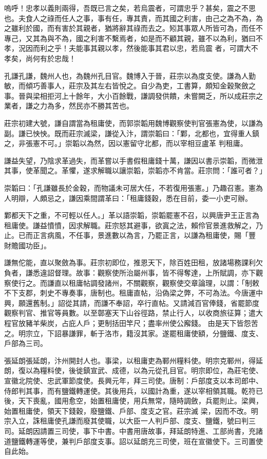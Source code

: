 \begin{pinyinscope}
 嗚呼！忠孝以義則兩得，吾既已言之矣，若烏震者，可謂忠乎？甚矣，震之不思也。夫食人之祿而任人之事，事有任，專其責，而其國之利害，由己之為不為，為之雖利於國，而有害於其親者，猶將辭其祿而去之。矧其事眾人所皆可為，而任不專己，又其為與不為，國之利害不繫焉者，如是而不顧其親，雖不以為利，猶曰不孝，況因而利之乎！夫能事其親以孝，然後能事其君以忠，若烏震
 者，可謂大不孝矣，尚何有於忠哉！



 孔謙孔謙，魏州人也，為魏州孔目官。魏博入于晉，莊宗以為度支使。謙為人勤敏，而傾巧善事人，莊宗及其左右皆悅之。自少為吏，工書算，頗知金穀聚斂之事。晉與梁相拒河上十餘年，大小百餘戰，謙調發供饋，未嘗闕乏，所以成莊宗之業者，謙之力為多，然民亦不勝其苦也。



 莊宗初建大號，謙自謂當為租庸使，而郭崇韜用魏博觀察使判官張憲為使，以謙為副。謙已怏怏。既而莊宗滅梁，謙從入汴，謂崇韜曰：「鄴，北都也，宜得重人鎮之，非張憲不可。」崇韜以為然，因以憲留守北都，而以宰相豆盧革
 判租庸。



 謙益失望，乃陰求革過失，而革嘗以手書假租庸錢十萬，謙因以書示崇韜，而微泄其事，使革聞之。革懼，遂求解職以讓崇韜，崇韜亦不肯當。莊宗問：「誰可者？」



 崇韜曰：「孔謙雖長於金穀，而物議未可居大任，不若復用張憲。」乃趣召憲。憲為人明辯，人頗忌之，謙因乘間謂革曰：「租庸錢穀，悉在目前，委一小吏可辦。



 鄴都天下之重，不可輕以任人。」革以語崇韜，崇韜罷憲不召，以興唐尹王正言為租庸使。謙益憤憤，因求解職。莊宗怒其避事，欲寘之法，賴伶官景進救解之，乃止。已而正言病風，不任事，景進數以為言，乃罷正言，以謙為租庸使，賜「豐
 財贍國功臣」。



 謙無佗能，直以聚斂為事。莊宗初即位，推恩天下，除百姓田租，放諸場務課利欠負者，謙悉違詔督理。故事：觀察使所治屬州事，皆不得奪達，上所賦調，亦下觀察使行之。而謙直以租庸帖調發諸州，不關觀察，觀察使交章論理，以謂：「制敕不下支郡，刺史不專奏事，唐制也。租庸直帖，沿偽梁之弊，不可為法。今唐運中興，願還舊制。」詔從其請，而謙不奉詔，卒行直帖。又請減百官俸錢，省罷節度觀察判官、推官等員數。以至鄣塞天下山谷徑路，禁止行人，以收商旅征算；遣大程官放豬羊柴炭，占庇人戶；更制括田竿尺；盡率州使公廨錢。
 由是天下皆怨苦之。明宗立，下詔暴謙罪，斬于洛市，籍沒其家。遂罷租庸使額，分鹽鐵、度支、戶部為三司。



 張延朗張延朗，汴州開封人也。事梁，以租庸吏為鄆州糧料使。明宗克鄆州，得延朗，復以為糧料使，後徙鎮宣武、成德，以為元從孔目官。明宗即位，為莊宅使、宣徽北院使、忠武軍節度使。長興元年，拜三司使。唐制：戶部度支以本司郎中、侍郎判其事，而有鹽鐵轉運使。其後用兵，以國計為重，遂以宰相領其職。乾符已後，天下喪亂，國用愈空，始置租庸使，用兵無常，隨時調斂，兵罷則止。梁興，始置租庸使，領天下錢穀，廢鹽鐵、戶部、度支之官。莊宗滅
 梁，因而不改。明宗入立，誅租庸使孔謙而廢其使職，以大臣一人判戶部、度支、鹽鐵，號曰判三司。延朗因請置三司使，事下中書。中書用唐故事，拜延朗特進、工部尚書，充諸道鹽鐵轉運等使，兼判戶部度支事。詔以延朗充三司使，班在宣徽使下。三司置使自此始。




\end{pinyinscope}
